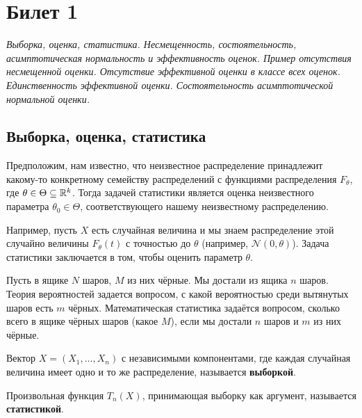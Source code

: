\section{Билет 1}

\begin{center}
    \it
    Выборка, оценка, статистика.
    Несмещенность, состоятельность, асимптотическая нормальность и эффективность оценок.
    Пример отсутствия несмещенной оценки.
    Отсутствие эффективной оценки в классе всех оценок.
    Единственность эффективной оценки.
    Состоятельность асимптотической нормальной оценки.
\end{center}

\subsection{Выборка, оценка, статистика}

Предположим, нам известно, что неизвестное распределение принадлежит какому-то конкретному семейству распределений с функциями распределения $F_{\theta}$, где $\theta \in \Theta \subseteq \mathbb{R}^k$. Тогда задачей статистики является оценка неизвестного параметра $\theta_0 \in \Theta$, соответствующего нашему неизвестному распределению.

Например, пусть $X$ есть случайная величина и мы знаем распределение этой случайно величины $F_{\theta}(t)$ с точностью до $\theta$ (например, $\mathcal{N}(0, \theta)$). Задача статистики заключается в том, чтобы оценить параметр $\theta$.

\begin{example}
    Пусть в ящике $N$ шаров, $M$ из них чёрные. Мы достали из ящика $n$ шаров. Теория вероятностей задается вопросом, с какой вероятностью среди вытянутых шаров есть $m$ чёрных. Математическая статистика задаётся вопросом, сколько всего в ящике чёрных шаров (какое $M$), если мы достали $n$ шаров и $m$ из них чёрные.
\end{example}

\begin{definition*}
    Вектор $X = (X_1, \dots, X_n)$ с независимыми компонентами, где каждая случайная величина имеет одно и то же распределение, называется \textbf{выборкой}.
\end{definition*}

\begin{definition*}
    Произвольная функция $T_n(X)$, принимающая выборку как аргумент, называется \textbf{статистикой}.
\end{definition*}

